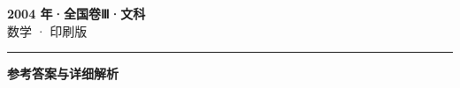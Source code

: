 \documentclass[zihao=5, a4paper]{ctexart}
\begin{document}
\begin{center}
  {\Large\bfseries 2004 年·全国卷Ⅲ·文科}\\[4pt]
  {\large 数学 · 印刷版}
\end{center}
\medskip
{}

\par\bigskip\hrule\bigskip
{}
\begin{center}{\large\bfseries 参考答案与详细解析}\end{center}
\smallskip

\end{document}
